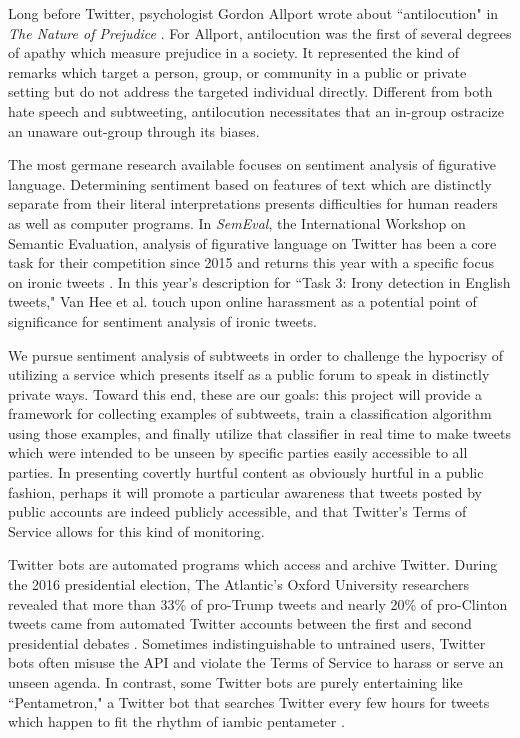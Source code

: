 \documentclass[11pt, twoside, reqno]{book}
\begin{document}
Long before Twitter, psychologist Gordon Allport wrote about ``antilocution" in \textit{The Nature of Prejudice} \cite{antilocution}. For Allport, antilocution was the first of several degrees of apathy which measure prejudice in a society. It represented the kind of remarks which target a person, group, or community in a public or private setting but do not address the targeted individual directly. Different from both hate speech and subtweeting, antilocution necessitates that an in-group ostracize an unaware out-group through its biases.

The most germane research available focuses on sentiment analysis of figurative language. Determining sentiment based on features of text which are distinctly separate from their literal interpretations presents difficulties for human readers as well as computer programs. In \textit{SemEval}, the International Workshop on Semantic Evaluation, analysis of figurative language on Twitter has been a core task for their competition since 2015 \cite{semeval_2015} and returns this year with a specific focus on ironic tweets \cite{semeval_2018}. In this year's description for ``Task 3: Irony detection in English tweets," Van Hee et al. touch upon online harassment as a potential point of significance for sentiment analysis of ironic tweets.  

We pursue sentiment analysis of subtweets in order to challenge the hypocrisy of utilizing a service which presents itself as a public forum to speak in distinctly private ways. Toward this end, these are our goals: this project will provide a framework for collecting examples of subtweets, train a classification algorithm using those examples, and finally utilize that classifier in real time to make tweets which were intended to be unseen by specific parties easily accessible to all parties. In presenting covertly hurtful content as obviously hurtful in a public fashion, perhaps it will promote a particular awareness that tweets posted by public accounts are indeed publicly accessible, and that Twitter's Terms of Service \cite{twitter_tos} allows for this kind of monitoring. 

Twitter bots are automated programs which access and archive Twitter. During the 2016 presidential election, The Atlantic's Oxford University researchers revealed that more than 33\% of pro-Trump tweets and nearly 20\% of pro-Clinton tweets came from automated Twitter accounts between the first and second presidential debates \cite{atlantic_bots}. Sometimes indistinguishable to untrained users, Twitter bots often misuse the API and violate the Terms of Service to harass or serve an unseen agenda. In contrast, some Twitter bots are purely entertaining like ``Pentametron," a Twitter bot that searches Twitter every few hours for tweets which happen to fit the rhythm of iambic pentameter \cite{pentametron}. 
\end{document}
